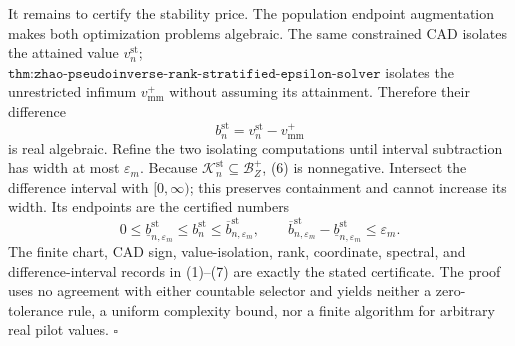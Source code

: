 It remains to certify the stability price.  The population endpoint augmentation makes both optimization problems algebraic.  The same constrained CAD isolates the attained value \(v_n^{\mathrm{st}}\); \(\texttt{thm:zhao-pseudoinverse-rank-stratified-epsilon-solver}\) isolates the unrestricted infimum \(v_{\mathrm{mm}}^+\) without assuming its attainment.  Therefore their difference
\[
b_n^{\mathrm{st}}=v_n^{\mathrm{st}}-v_{\mathrm{mm}}^+
\tag{6}
\]
is real algebraic.  Refine the two isolating computations until interval subtraction has width at most \(\varepsilon_m\).  Because \(\mathcal K_n^{\mathrm{st}}\subseteq\mathcal B_Z^+\), (6) is nonnegative.  Intersect the difference interval with \([0,\infty)\); this preserves containment and cannot increase its width.  Its endpoints are the certified numbers
\[
0\le\underline b_{n,\varepsilon_m}^{\mathrm{st}}
\le b_n^{\mathrm{st}}
\le\overline b_{n,\varepsilon_m}^{\mathrm{st}},
\qquad
\overline b_{n,\varepsilon_m}^{\mathrm{st}}
-\underline b_{n,\varepsilon_m}^{\mathrm{st}}\le\varepsilon_m.
\tag{7}
\]
The finite chart, CAD sign, value-isolation, rank, coordinate, spectral, and difference-interval records in (1)--(7) are exactly the stated certificate.  The proof uses no agreement with either countable selector and yields neither a zero-tolerance rule, a uniform complexity bound, nor a finite algorithm for arbitrary real pilot values. \(\square\)
